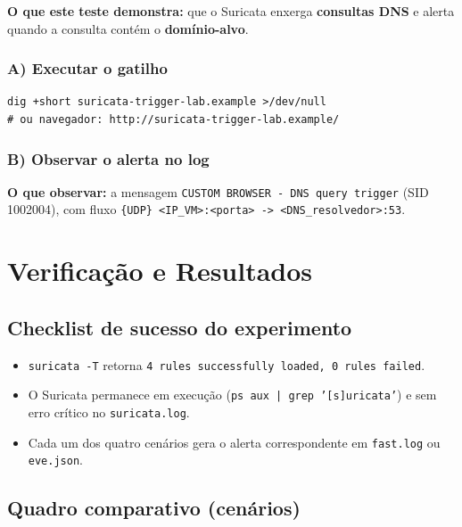 \textbf{O que este teste demonstra:} que o Suricata enxerga \textbf{consultas DNS} e alerta quando a consulta contém o \textbf{domínio-alvo}.

\subsubsection*{A) Executar o gatilho}

\begin{lstlisting}
dig +short suricata-trigger-lab.example >/dev/null
# ou navegador: http://suricata-trigger-lab.example/
\end{lstlisting}


\subsubsection*{B) Observar o alerta no log}

\textbf{O que observar:} a mensagem \texttt{CUSTOM BROWSER - DNS query trigger} (SID 1002004), com fluxo \texttt{\{UDP\} <IP\_VM>:<porta> -> <DNS\_resolvedor>:53}.

\section{Verificação e Resultados}

\subsection{Checklist de sucesso do experimento}

\begin{itemize}
  \item \texttt{suricata -T} retorna \texttt{4 rules successfully loaded, 0 rules failed}.
  \item O Suricata permanece em execução (\texttt{ps aux | grep '[s]uricata'}) e sem erro crítico no \texttt{suricata.log}.
  \item Cada um dos quatro cenários gera o alerta correspondente em \texttt{fast.log} ou \texttt{eve.json}.
\end{itemize}

\subsection{Quadro comparativo (cenários)}

